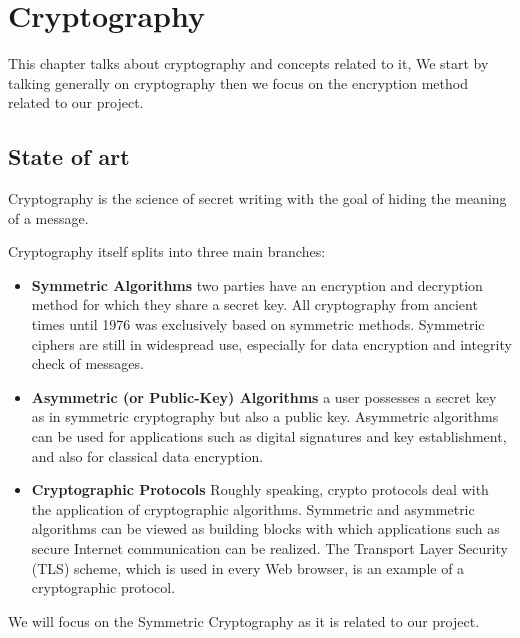 \documentclass[../main.tex]{subfiles}
\begin{document}
\chapter{Cryptography}

This chapter talks about cryptography and concepts related to it, We start by talking generally on cryptography then we focus on the encryption method related to our project.

\section{State of art}

Cryptography is the science of secret writing with the goal of hiding the meaning of a message.\cite{10.5555/1721909}

Cryptography itself splits into three main branches:

\begin{itemize}
\item \textbf{Symmetric Algorithms} two parties have an encryption and decryption method for which they share a
secret key. All cryptography from ancient times until 1976 was exclusively based
on symmetric methods. Symmetric ciphers are still in widespread use, especially
for data encryption and integrity check of messages.\cite{10.5555/1721909}
\end{itemize}


\begin{itemize}
\item \textbf{Asymmetric (or Public-Key) Algorithms} a user possesses a secret key as in symmetric cryptography but also a public key. Asymmetric algorithms can be used for applications
such as digital signatures and key establishment, and also for classical data encryption.\cite{10.5555/1721909}
\end{itemize}


\begin{itemize}
\item \textbf{Cryptographic Protocols} Roughly speaking, crypto protocols deal with the application of cryptographic algorithms. Symmetric and asymmetric algorithms can be viewed as building blocks with which applications such as secure Internet communication can be realized. The Transport Layer Security (TLS) scheme,
which is used in every Web browser, is an example of a cryptographic protocol.\cite{10.5555/1721909}
\end{itemize}

We will focus on the Symmetric Cryptography as it is related to our project.
\end{document}
